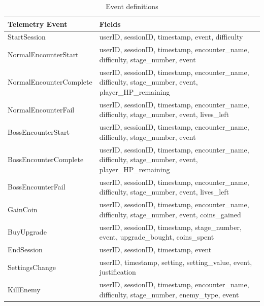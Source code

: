 \documentclass[11pt]{article}
\begin{document}
\begin{table}[H]
  \begin{center}
    \begin{tabularx}{\textwidth}{
        | >{\centering\arraybackslash\hsize=0.4\hsize}X
      | >{\centering\arraybackslash\hsize=0.6\hsize}X |}
      \hline
      \textbf{Telemetry Event} & \textbf{Fields}  \\
      \hline
      StartSession & userID, sessionID, timestamp, event, difficulty \\
      \hline
      NormalEncounterStart & userID, sessionID, timestamp, encounter\_name, difficulty, stage\_number, event \\
      \hline
      NormalEncounterComplete & userID, sessionID, timestamp, encounter\_name, difficulty, stage\_number, event, player\_HP\_remaining \\
      \hline
      NormalEncounterFail & userID, sessionID, timestamp, encounter\_name, difficulty, stage\_number, event, lives\_left \\
      \hline
      BossEncounterStart & userID, sessionID, timestamp, encounter\_name, difficulty, stage\_number, event \\
      \hline
      BossEncounterComplete & userID, sessionID, timestamp, encounter\_name, difficulty, stage\_number, event, player\_HP\_remaining \\
      \hline
      BossEncounterFail & userID, sessionID, timestamp, encounter\_name, difficulty, stage\_number, event, lives\_left \\
      \hline
      GainCoin & userID, sessionID, timestamp, encounter\_name, difficulty, stage\_number, event, coins\_gained \\
      \hline
      BuyUpgrade & userID, sessionID, timestamp, stage\_number, event, upgrade\_bought, coins\_spent \\
      \hline
      EndSession & userID, sessionID, timestamp, event \\
      \hline
      SettingsChange & userID, timestamp, setting, setting\_value, event, justification \\
      \hline
      KillEnemy & userID, sessionID, timestamp, encounter\_name, difficulty, stage\_number, enemy\_type, event \\
      \hline
    \end{tabularx}
    \caption{Event definitions}
    \label{tab:event_definitions}
  \end{center}
\end{table}
\end{document}
